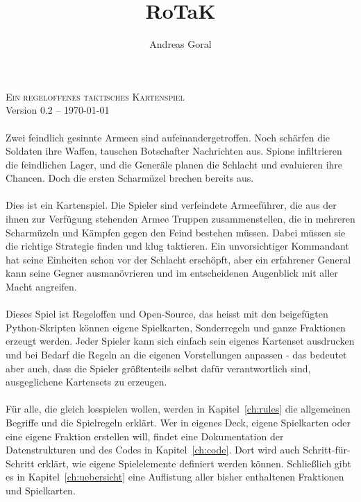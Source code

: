 \documentclass[a4paper,11pt]{report}
\title{RoTaK}
\author{Andreas Goral}
\newcommand{\cref}[1]{Kapitel~\ref{#1}}
\begin{document}
\begin{titlepage}
\begin{center}
\textsc{
{\huge Ein regeloffenes taktisches Kartenspiel}}\\[0.5cm]
Version 0.2 -- \today \\
\vfill
\end{center}
\end{titlepage}
\tableofcontents
\newpage

\paragraph{}
Zwei feindlich gesinnte Armeen sind aufeinandergetroffen. Noch schärfen die Soldaten ihre Waffen, tauschen Botschafter Nachrichten aus. Spione infiltrieren die feindlichen Lager, und die Generäle planen die Schlacht und evaluieren ihre Chancen. Doch die ersten Scharmüzel brechen bereits aus.

\paragraph{}
Dies ist ein Kartenspiel. Die Spieler sind verfeindete Armeeführer, die aus der ihnen zur Verfügung stehenden Armee Truppen zusammenstellen, die in mehreren Scharmüzeln und Kämpfen gegen den Feind bestehen müssen. Dabei müssen sie die richtige Strategie finden und klug taktieren. Ein unvorsichtiger Kommandant hat seine Einheiten schon vor der Schlacht erschöpft, aber ein erfahrener General kann seine Gegner ausmanövrieren und im entscheidenen Augenblick mit aller Macht angreifen.

\paragraph{}
Dieses Spiel ist Regeloffen und Open-Source, das heisst mit den beigefügten Python-Skripten können eigene Spielkarten, Sonderregeln und ganze Fraktionen erzeugt werden. Jeder Spieler kann sich einfach sein eigenes Kartenset ausdrucken und bei Bedarf die Regeln an die eigenen Vorstellungen anpassen - das bedeutet aber auch, dass die Spieler größtenteils selbst dafür verantwortlich sind, ausgeglichene Kartensets zu erzeugen.

\paragraph{}
Für alle, die gleich losspielen wollen, werden in \cref{ch:rules} die allgemeinen Begriffe und die Spielregeln erklärt. Wer in eigenes Deck, eigene Spielkarten oder eine eigene Fraktion erstellen will, findet eine Dokumentation der Datenstrukturen und des Codes in \cref{ch:code}. Dort wird auch Schritt-für-Schritt erklärt, wie eigene Spielelemente definiert werden können. Schließlich gibt es in \cref{ch:uebersicht} eine Auflistung aller bisher enthaltenen Fraktionen und Spielkarten.
\end{document}
